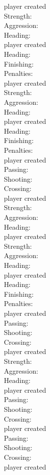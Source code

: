 \documentclass[]{article}
\begin{document}
{player created\\
Strength:\\
Aggression:\\
Heading:\\
player created\\
Heading:\\
Finishing:\\
Penalties:\\
player created\\
Strength:\\
Aggression:\\
Heading:\\
player created\\
Heading:\\
Finishing:\\
Penalties:\\
player created\\
Passing:\\
Shooting:\\
Crossing:\\
player created\\
Strength:\\
Aggression:\\
Heading:\\
player created\\
Strength:\\
Aggression:\\
Heading:\\
player created\\
Heading:\\
Finishing:\\
Penalties:\\
player created\\
Passing:\\
Shooting:\\
Crossing:\\
player created\\
Strength:\\
Aggression:\\
Heading:\\
player created\\
Passing:\\
Shooting:\\
Crossing:\\
player created\\
Passing:\\
Shooting:\\
Crossing:\\
player created\\
}
\end{document}
